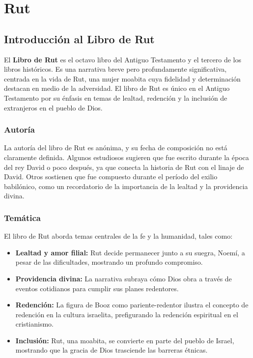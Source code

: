 \chapter{Rut}


\section*{Introducción al Libro de Rut}

El \textbf{Libro de Rut} es el octavo libro del Antiguo Testamento y el tercero de los libros históricos. Es una narrativa breve pero profundamente significativa, centrada en la vida de Rut, una mujer moabita cuya fidelidad y determinación destacan en medio de la adversidad. El libro de Rut es único en el Antiguo Testamento por su énfasis en temas de lealtad, redención y la inclusión de extranjeros en el pueblo de Dios.

\subsection*{Autoría}

La autoría del libro de Rut es anónima, y su fecha de composición no está claramente definida. Algunos estudiosos sugieren que fue escrito durante la época del rey David o poco después, ya que conecta la historia de Rut con el linaje de David. Otros sostienen que fue compuesto durante el período del exilio babilónico, como un recordatorio de la importancia de la lealtad y la providencia divina.

\subsection*{Temática}

El libro de Rut aborda temas centrales de la fe y la humanidad, tales como:
\begin{itemize}
	\item \textbf{Lealtad y amor filial:} Rut decide permanecer junto a su suegra, Noemí, a pesar de las dificultades, mostrando un profundo compromiso.
	\item \textbf{Providencia divina:} La narrativa subraya cómo Dios obra a través de eventos cotidianos para cumplir sus planes redentores.
	\item \textbf{Redención:} La figura de Booz como pariente-redentor ilustra el concepto de redención en la cultura israelita, prefigurando la redención espiritual en el cristianismo.
	\item \textbf{Inclusión:} Rut, una moabita, se convierte en parte del pueblo de Israel, mostrando que la gracia de Dios trasciende las barreras étnicas.
\end{itemize}

